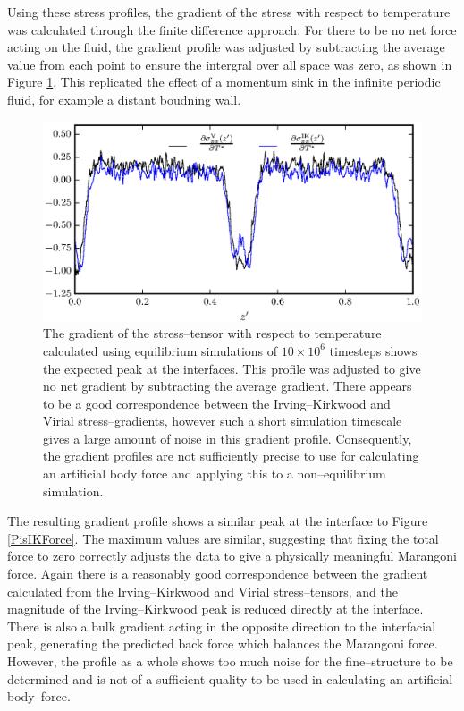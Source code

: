 \FloatBarrier
Using these stress profiles, the gradient of the stress with respect to temperature was calculated through the finite difference approach.
For there to be no net force acting on the fluid, the gradient profile was adjusted by subtracting the average value from each point to ensure the intergral over all space was zero, as shown in Figure \ref{Period10Force}.
This replicated the effect of a momentum sink in the infinite periodic fluid, for example a distant boudning wall.

\begin{figure}[h]
\centering
\includegraphics[scale=0.8]{Period10Force}
\caption{The gradient of the stress--tensor with respect to temperature calculated using equilibrium simulations of $10 \times 10^{6}$ timesteps shows the expected peak at the interfaces. 
This profile was adjusted to give no net gradient by subtracting the average gradient.
There appears to be a good correspondence between the Irving--Kirkwood and Virial stress--gradients, however such a short simulation timescale gives a large amount of noise in this gradient profile.
Consequently, the gradient profiles are not sufficiently precise to use for calculating an artificial body force and applying this to a non--equilibrium simulation.
}
\label{Period10Force}
\end{figure}
The resulting gradient profile shows a similar peak at the interface to Figure \ref{PisIKForce}. 
The maximum values are similar, suggesting that fixing the total force to zero correctly adjusts the data to give a physically meaningful Marangoni force.
Again there is a reasonably good correspondence between the gradient calculated from the Irving--Kirkwood and Virial stress--tensors, and the magnitude of the Irving--Kirkwood peak is reduced directly at the interface.
There is also a bulk gradient acting in the opposite direction to the interfacial peak, generating the predicted back force which balances the Marangoni force.
However, the profile as a whole shows too much noise for the fine--structure to be determined and is not of a sufficient quality to be used in calculating an artificial body--force.

